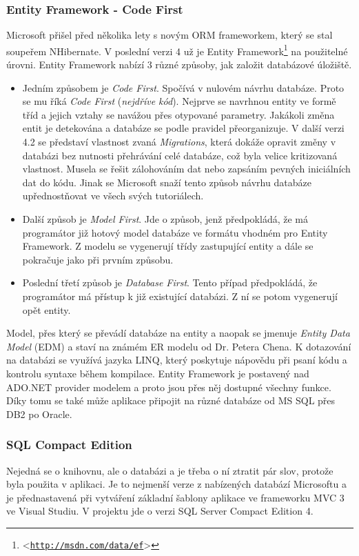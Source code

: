 \documentclass[11pt,twoside,a4paper]{book}
\let\oldUrl\url
\renewcommand\url[1]{<\texttt{\oldUrl{#1}}>}
\begin{document}
\subsubsection{Entity Framework - Code First}
\label{sec:ef}
Microsoft přišel před několika lety s novým ORM frameworkem, který se stal soupeřem NHibernate. V poslední verzi 4 už je Entity Framework\footnote{\url{http://msdn.com/data/ef}} na použitelné úrovni. Entity Framework nabízí 3 různé způsoby, jak založit databázové úložiště. 

\begin{itemize}
\item Jedním způsobem je \textit{Code First}. Spočívá v nulovém návrhu databáze. Proto se mu říká \textit{Code First} (\textit{nejdříve kód}). Nejprve se navrhnou entity ve formě tříd a jejich vztahy se navážou přes otypované parametry. Jakákoli změna entit je detekována a databáze se podle pravidel přeorganizuje. V další verzi 4.2 se představí vlastnost zvaná \textit{Migrations}, která dokáže opravit změny v databázi bez nutnosti přehrávání celé databáze, což byla velice kritizovaná vlastnost. Musela se řešit zálohováním dat nebo zapsáním pevných iniciálních dat do kódu. Jinak se Microsoft snaží tento způsob návrhu databáze upřednostňovat ve všech svých tutoriálech.

\item Další způsob je \textit{Model First}. Jde o způsob, jenž předpokládá, že má programátor již hotový model databáze ve formátu vhodném pro Entity Framework. Z modelu se vygenerují třídy zastupující entity a dále se pokračuje jako při prvním způsobu. 

\item Poslední třetí způsob je \textit{Database First}. Tento případ předpokládá, že programátor má přístup k již existující databázi. Z ní se potom vygenerují opět entity.

\end{itemize}

Model, přes který se převádí databáze na entity a naopak se jmenuje \textit{Entity Data Model} (EDM) a staví na známém ER modelu od Dr. Petera Chena. K dotazování na databázi se využívá jazyka LINQ, který poskytuje nápovědu při psaní kódu a kontrolu syntaxe během kompilace. Entity Framework je postavený nad ADO.NET provider modelem a proto jsou přes něj dostupné všechny funkce. Díky tomu se také může aplikace připojit na různé databáze od MS SQL přes DB2 po Oracle\cite{efintro}.


\subsubsection{SQL Compact Edition}
Nejedná se o knihovnu, ale o databázi a je třeba o ní ztratit pár slov, protože byla použita v aplikaci. Je to nejmenší verze z nabízených databází Microsoftu a je přednastavená při vytváření základní šablony aplikace ve frameworku MVC 3 ve Visual Studiu. V projektu jde o verzi SQL Server Compact Edition 4.
\end{document}
